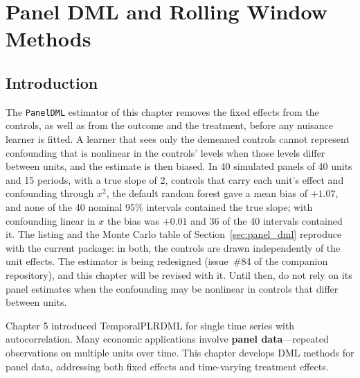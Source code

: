 
\chapter{Panel DML and Rolling Window Methods}
\label{ch:panel_dml}

\section{Introduction}\label{sec:ch06_introduction}

\begin{warnbox}
The \texttt{PanelDML} estimator of this chapter removes the fixed effects from the controls, as
well as from the outcome and the treatment, before any nuisance learner is fitted. A learner that
sees only the demeaned controls cannot represent confounding that is nonlinear in the controls'
levels when those levels differ between units, and the estimate is then biased. In 40 simulated
panels of 40 units and 15 periods, with a true slope of 2, controls that carry each unit's effect
and confounding through $x^2$, the default random forest gave a mean bias of $+1.07$, and
none of the 40 nominal 95\% intervals contained the true slope; with confounding linear
in $x$ the bias was $+0.01$ and 36 of the 40 intervals contained it. The listing and the Monte Carlo table of
Section~\ref{sec:panel_dml} reproduce with the current package: in both, the controls are drawn
independently of the unit effects. The estimator is being redesigned (issue~\#84 of the companion
repository), and this chapter will be revised with it. Until then, do not rely on its panel
estimates when the confounding may be nonlinear in controls that differ between units.
\end{warnbox}

Chapter 5 introduced TemporalPLRDML for single time series with autocorrelation. Many economic applications involve \textbf{panel data}---repeated observations on multiple units over time. This chapter develops DML methods for panel data, addressing both fixed effects and time-varying treatment effects.


